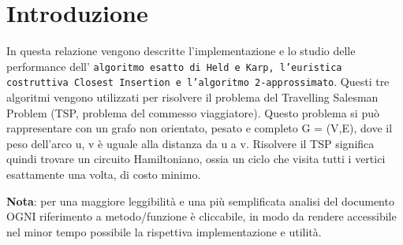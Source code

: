 \section{Introduzione}
\label{Introduzione}

In questa relazione vengono descritte l'implementazione e lo studio delle performance dell' \texttt{algoritmo esatto di Held e Karp, l'euristica costruttiva Closest Insertion e l'algoritmo 2-approssimato}.
Questi tre algoritmi vengono utilizzati per risolvere il problema del Travelling Salesman Problem (TSP, problema del commesso viaggiatore). Questo problema si può rappresentare con un grafo non orientato, pesato e
completo G = (V,E), dove il peso dell’arco {u, v} è uguale alla distanza da u a v. Risolvere il TSP significa quindi trovare un circuito Hamiltoniano, ossia un ciclo che visita tutti i vertici esattamente una volta, di costo minimo.
\newline

\textbf{Nota}: per una maggiore leggibilità e una più semplificata analisi del documento OGNI riferimento a metodo/funzione è cliccabile, in modo da rendere accessibile nel minor tempo possibile la rispettiva implementazione e utilità.